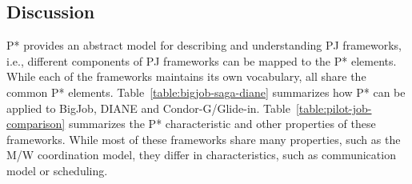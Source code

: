 \documentclass[conference]{IEEEtran}
\begin{document}
\subsection{Discussion}

P* provides an abstract model for describing and understanding PJ
frameworks, i.e., different components of PJ frameworks can be mapped
to the P* elements.  While each of the frameworks maintains its own
vocabulary, all share the common P* elements.
Table~\ref{table:bigjob-saga-diane} summarizes how P* can be applied
to BigJob, DIANE and Condor-G/Glide-in.
Table~\ref{table:pilot-job-comparison} summarizes the P*
characteristic and other properties of these frameworks. While most of
these frameworks share many properties, such as the M/W coordination
model, they differ in characteristics, such as communication model
or scheduling. 










% 
\end{document}

